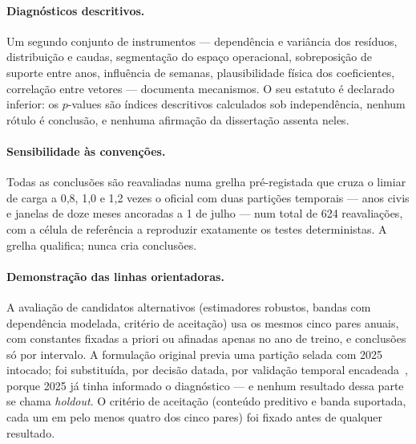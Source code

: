 \paragraph{Diagnósticos descritivos.} Um segundo conjunto de instrumentos
--- dependência e variância dos resíduos, distribuição e caudas,
segmentação do espaço operacional, sobreposição de suporte entre anos,
influência de semanas, plausibilidade física dos coeficientes, correlação
entre vetores --- documenta mecanismos. O seu estatuto é declarado
inferior: os $p$-values são índices descritivos calculados sob
independência, nenhum rótulo é conclusão, e nenhuma afirmação da
dissertação assenta neles.

\paragraph{Sensibilidade às convenções.} Todas as conclusões são
reavaliadas numa grelha pré-registada que cruza o limiar de carga a 0,8,
1,0 e 1,2 vezes o oficial com duas partições temporais --- anos civis e
janelas de doze meses ancoradas a 1 de julho --- num total de 624
reavaliações, com a célula de referência a reproduzir exatamente os testes
deterministas. A grelha qualifica; nunca cria conclusões.

\paragraph{Demonstração das linhas orientadoras.} A avaliação de
candidatos alternativos (estimadores robustos, bandas com dependência
modelada, critério de aceitação) usa os mesmos cinco pares anuais, com
constantes fixadas a priori ou afinadas apenas no ano de treino, e
conclusões só por intervalo. A formulação original previa uma partição
selada com 2025 intocado; foi substituída, por decisão datada, por
validação temporal encadeada~\cite{Tashman2000,BergmeirHyndmanKoo2018},
porque 2025 já tinha informado o diagnóstico --- e nenhum resultado dessa parte se chama \emph{holdout}. O
critério de aceitação (conteúdo preditivo e banda suportada, cada um em
pelo menos quatro dos cinco pares) foi fixado antes de qualquer resultado.

